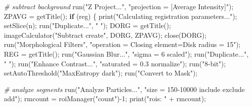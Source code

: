 \documentclass[10pt, b5paper, singlespacinge, twoside]{reedthesis} %
\newenvironment{Shaded}{}{}
\newcommand{\CommentTok}[1]{\textit{#1}}
\newcommand{\ControlFlowTok}[1]{\textbf{#1}}
\newcommand{\DecValTok}[1]{#1}
\newcommand{\FunctionTok}[1]{#1}
\newcommand{\NormalTok}[1]{#1}
\newcommand{\OtherTok}[1]{#1}
\newcommand{\SpecialCharTok}[1]{#1}
\newcommand{\StringTok}[1]{#1}
\theoremstyle{definition}
\theoremstyle{definition}
\theoremstyle{definition}
\theoremstyle{remark}
\begin{document}
\scriptsize
\begin{Shaded}
\begin{Highlighting}[numbers=left,,]
\CommentTok{\#   subtract background}
        \FunctionTok{run}\NormalTok{(}\StringTok{"Z Project..."}\NormalTok{, }\StringTok{"projection = [Average Intensity]"}\NormalTok{);}
\NormalTok{        ZPAVG }\OtherTok{=} \FunctionTok{getTitle}\NormalTok{();}
        \ControlFlowTok{if}\NormalTok{ (reg) \{}
            \FunctionTok{print}\NormalTok{(}\StringTok{"Calculating registration parameters..."}\NormalTok{);}
            \FunctionTok{setSlice}\NormalTok{(n);}
            \FunctionTok{run}\NormalTok{(}\StringTok{"Duplicate..."}\NormalTok{, }\StringTok{" "}\NormalTok{); }
\NormalTok{            DORG }\OtherTok{=} \FunctionTok{getTitle}\NormalTok{();}
            \FunctionTok{imageCalculator}\NormalTok{(}\StringTok{"Subtract create"}\NormalTok{, DORG, ZPAVG);}
            \FunctionTok{close}\NormalTok{(DORG);}
            \FunctionTok{run}\NormalTok{(}\StringTok{"Morphological Filters"}\NormalTok{,}
                \StringTok{"operation = Closing element=Disk radius = 15"}\NormalTok{);}
\NormalTok{            REG }\OtherTok{=} \FunctionTok{getTitle}\NormalTok{();}
            \FunctionTok{run}\NormalTok{(}\StringTok{"Gaussian Blur..."}\NormalTok{, }\StringTok{"sigma = 6 scaled"}\NormalTok{); }
            \FunctionTok{run}\NormalTok{(}\StringTok{"Duplicate..."}\NormalTok{, }\StringTok{" "}\NormalTok{);}
            \FunctionTok{run}\NormalTok{(}\StringTok{"Enhance Contrast..."}\NormalTok{, }\StringTok{"saturated = 0.3 normalize"}\NormalTok{);}
            \FunctionTok{run}\NormalTok{(}\StringTok{"8{-}bit"}\NormalTok{);}
            \FunctionTok{setAutoThreshold}\NormalTok{(}\StringTok{"MaxEntropy  dark"}\NormalTok{);}
            \FunctionTok{run}\NormalTok{(}\StringTok{"Convert to Mask"}\NormalTok{);}

    \CommentTok{\# analyze segments}
        \FunctionTok{run}\NormalTok{(}\StringTok{"Analyze Particles..."}\NormalTok{, }\StringTok{"size = 150{-}10000 include exclude add"}\NormalTok{);}
\NormalTok{        rmcount }\OtherTok{=} \FunctionTok{roiManager}\NormalTok{(}\StringTok{"count"}\NormalTok{)}\SpecialCharTok{{-}}\DecValTok{1}\NormalTok{;}
        \FunctionTok{print}\NormalTok{(}\StringTok{"rois: "} \SpecialCharTok{+}\NormalTok{ rmcount);}
        

\end{Highlighting}
\end{Shaded}
\end{document}
